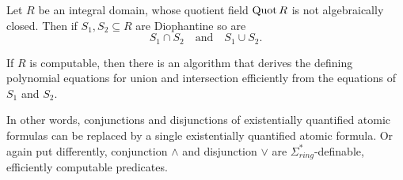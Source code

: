 \begin{lem}\label{lem:intersections and unions}
    Let $R$ be an integral domain, whose quotient field $\operatorname{Quot} R$ is not
    algebraically closed. Then if $S_1, S_2 \subseteq R$ are Diophantine so are
    \[
      S_1 ∩ S_2 \quad \text{and} \quad S_1 ∪ S_2.
    \]

    If $R$ is computable, then there is an algorithm that derives the defining
    polynomial equations for union and intersection efficiently from the
    equations of $S_1$ and $S_2$.
\end{lem}

In other words, conjunctions and disjunctions of existentially quantified atomic
formulas can be replaced by a single existentially quantified atomic formula. Or
again put differently, conjunction $∧$ and disjunction $∨$ are
$Σ_{ring}^*$-definable, efficiently computable predicates.


